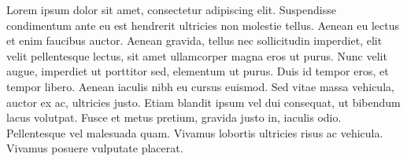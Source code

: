 Lorem ipsum dolor sit amet, consectetur adipiscing elit. Suspendisse condimentum ante eu est hendrerit ultricies non molestie tellus. Aenean eu lectus et enim faucibus auctor. Aenean gravida, tellus nec sollicitudin imperdiet, elit velit pellentesque lectus, sit amet ullamcorper magna eros ut purus. Nunc velit augue, imperdiet ut porttitor sed, elementum ut purus. Duis id tempor eros, et tempor libero. Aenean iaculis nibh eu cursus euismod. Sed vitae massa vehicula, auctor ex ac, ultricies justo. Etiam blandit ipsum vel dui consequat, ut bibendum lacus volutpat. Fusce et metus pretium, gravida justo in, iaculis odio. Pellentesque vel malesuada quam. Vivamus lobortis ultricies risus ac vehicula. Vivamus posuere vulputate placerat.\\
